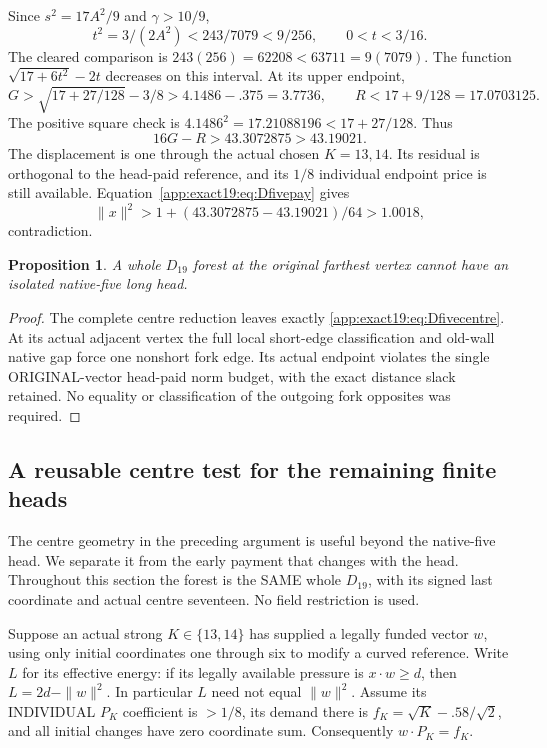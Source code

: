 \documentclass[11pt]{article}
\newtheorem{proposition}[theorem]{Proposition}
\theoremstyle{definition}
\theoremstyle{remark}
\begin{document}
Since \(s^2=17A^2/9\) and
\(\gamma>10/9\),
\[
                  t^2=3/(2A^2)<243/7079<9/256,\qquad0<t<3/16 .
\]
The cleared comparison is
\(243(256)=62208<63711=9(7079)\).
The function
\(\sqrt{17+6t^2}-2t\)
decreases on this interval.
At its upper endpoint,
\[
 G>\sqrt{17+27/128}-3/8>4.1486-.375=3.7736,\qquad
 R<17+9/128=17.0703125 .
\]
The positive square check is
\(4.1486^2=17.21088196<17+27/128\).
Thus
\[
                              16G-R>43.3072875>43.19021 .
\]
The displacement is one through
the actual chosen \(K=13,14\).
Its residual is orthogonal
to the head-paid reference,
and its \(1/8\) individual
endpoint price is still available.
Equation~\eqref{app:exact19:eq:Dfivepay}
gives
\[
                 \|x\|^2>1+(43.3072875-43.19021)/64>1.0018 ,
\]
contradiction.

\begin{proposition}\label{app:exact19:prop:Dfive}
A whole \(D_{19}\) forest at the
original farthest vertex cannot
have an isolated native-five
long head.
\end{proposition}
\begin{proof}
The complete centre reduction
leaves exactly
\eqref{app:exact19:eq:Dfivecentre}.
At its actual adjacent vertex
the full local short-edge
classification and old-wall
native gap force one nonshort
fork edge.
Its actual endpoint violates
the single ORIGINAL-vector
head-paid norm budget, with
the exact distance slack retained.
No equality or classification
of the outgoing fork opposites
was required.
\end{proof}

\subsection{A reusable centre test for the remaining finite heads}
\label{app:exact19:Dfinitecentretest}

The centre geometry in the preceding argument is useful beyond the
native-five head. We separate it from the early payment that changes
with the head. Throughout this section the forest is the SAME whole
\(D_{19}\), with its signed last coordinate and actual centre seventeen.
No field restriction is used.

Suppose an actual strong \(K\in\{13,14\}\) has supplied a legally funded
vector \(w\), using only initial coordinates one through six to modify a
curved reference. Write \(L\) for its effective energy: if its legally
available pressure is \(x\cdot w\ge d\), then \(L=2d-\|w\|^2\).
In particular \(L\) need not equal \(\|w\|^2\).
Assume its INDIVIDUAL \(P_K\) coefficient is \(>1/8\), its demand there
is \(f_K=\sqrt K-.58/\sqrt2\), and all initial changes have zero
coordinate sum. Consequently \(w\cdot P_K=f_K\).
\end{document}
